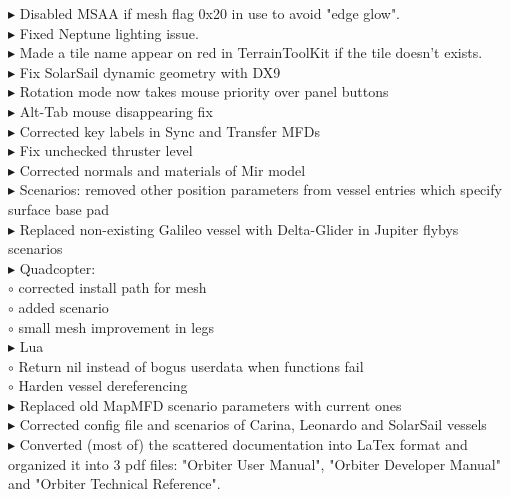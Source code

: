 \documentclass[Orbiter User Manual.tex]{subfiles}
\begin{document}
$\blacktriangleright$ Disabled MSAA if mesh flag 0x20 in use to avoid "edge glow".\\
$\blacktriangleright$ Fixed Neptune lighting issue.\\
$\blacktriangleright$ Made a tile name appear on red in TerrainToolKit if the tile doesn't exists.\\
$\blacktriangleright$ Fix SolarSail dynamic geometry with DX9\\
$\blacktriangleright$ Rotation mode now takes mouse priority over panel buttons\\
$\blacktriangleright$ Alt-Tab mouse disappearing fix\\
$\blacktriangleright$ Corrected key labels in Sync and Transfer MFDs\\
$\blacktriangleright$ Fix unchecked thruster level\\
$\blacktriangleright$ Corrected normals and materials of Mir model\\
$\blacktriangleright$ Scenarios: removed other position parameters from vessel entries which specify surface base pad\\
$\blacktriangleright$ Replaced non-existing Galileo vessel with Delta-Glider in Jupiter flybys scenarios\\
$\blacktriangleright$ Quadcopter:\\
$\circ$ corrected install path for mesh\\
$\circ$ added scenario\\
$\circ$ small mesh improvement in legs\\
$\blacktriangleright$ Lua\\
$\circ$ Return nil instead of bogus userdata when functions fail\\
$\circ$ Harden vessel dereferencing\\
$\blacktriangleright$ Replaced old MapMFD scenario parameters with current ones\\
$\blacktriangleright$ Corrected config file and scenarios of Carina, Leonardo and SolarSail vessels\\
$\blacktriangleright$ Converted (most of) the scattered documentation into LaTex format and organized it into 3 pdf files: "Orbiter User Manual", "Orbiter Developer Manual" and "Orbiter Technical Reference".\\
\end{document}
